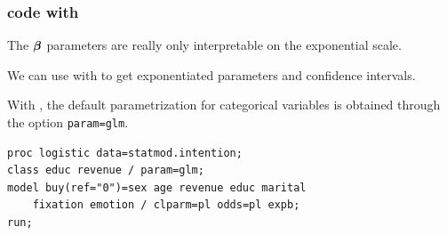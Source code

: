 \documentclass{beamer}
\begin{document}
\begin{frame}[fragile]
\frametitle{\SASlang code with }
\bi
\item The $\boldsymbol {\beta}$ parameters are really only interpretable on the exponential scale.
\item We can use  with  to get exponentiated parameters and confidence intervals.
\item With , the default parametrization for categorical variables is obtained through the option \texttt{param=glm}.
\ei
\begin{tcolorbox}[colback=white, colframe=hecblue, title=\SASlang code with \code{proc logistic}]
\begin{verbatim}
proc logistic data=statmod.intention;
class educ revenue / param=glm;
model buy(ref="0")=sex age revenue educ marital 
    fixation emotion / clparm=pl odds=pl expb;
run;
\end{verbatim}
\end{tcolorbox}
\end{frame}
% 
% 
\end{document}
